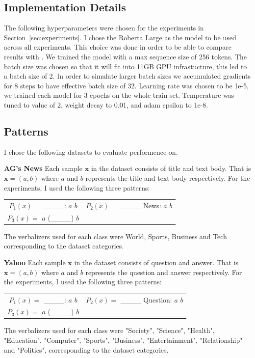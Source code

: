 \documentclass[11pt,a4paper]{article}
\begin{document}
\subsection{Implementation Details}
\label{apx:implementation-details}
The following hyperparameters were chosen for the experiments in Section~\ref{sec:experiments}.
I chose the Roberta Large as the model to be used across all experiments.
This choice was done in order to be able to compare results with \citet{schick2020exploiting}.
We trained the model with a max sequence size of 256 tokens.
The batch size was chosen so that it will fit into 11GB GPU infrastucture, this led to a batch size of 2. 
In order to simulate larger batch sizes we accumulated gradients for 8 steps to have effective batch size of 32.
Learning rate was chosen to be 1e-5, we trained each model for 3 epochs on the whole train set.
Temperature was tuned to value of 2, weight decay to 0.01, and adam epsilon to 1e-8.

\subsection{Patterns}
\label{apx:patterns}
I chose the following datasets to evaluate performence on.

\vspace{8pt}
\noindent \textbf{AG's News} \quad
Each sample $\textbf{x}$ in the dataset consists of title and text body.
That is $\textbf{x}=(a, b)$ where $a$ and $b$ represents the title and text body respectively.
For the experiments, I used the following three patterns:
\begin{table}[H]
	\renewcommand{\arraystretch}{1.5}
	\begin{tabularx}{\textwidth}{cc}
		 $P_1(x)=$ \_\_\_\_: $a$ $b$ & $P_2(x)=$ \_\_\_\_ News: $a$ $b$ \\
		 $P_3(x)=$ $a$ (\_\_\_\_) $b$ &  \\
	\end{tabularx}
\end{table}
The verbalizers used for each class were World, Sports, Business and Tech corresponding to the dataset categories.

\vspace{8pt}
\noindent \textbf{Yahoo} \quad
Each sample $\textbf{x}$ in the dataset consists of question and answer.
That is $\textbf{x}=(a, b)$ where $a$ and $b$ represents the question and answer respectively.
For the experiments, I used the following three patterns:
\begin{table}[H]
	\renewcommand{\arraystretch}{1.5}
	\begin{tabularx}{\textwidth}{cc}
		$P_1(x)=$ \_\_\_\_: $a$ $b$ & $P_2(x)=$ \_\_\_\_ Question: $a$ $b$ \\
		$P_3(x)=$ $a$ (\_\_\_\_) $b$ &  \\
	\end{tabularx}
\end{table}
The verbalizers used for each class were "Society", "Science", "Health", "Education", "Computer", "Sports", "Business", "Entertainment", "Relationship" and "Politics", corresponding to the dataset categories.
\end{document}
